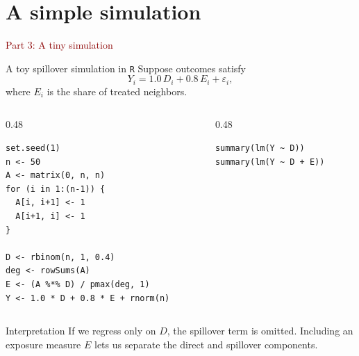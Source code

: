 \documentclass[dvipsnames,aspectratio=169,handout]{beamer}
\begin{document}

\section{A simple simulation}

\begin{frame}{}
\begin{center}
{\Huge \textcolor{DarkRed}{Part 3: A tiny simulation}}
\end{center}
\end{frame}

\begin{frame}[fragile]{A toy spillover simulation in \texttt{R}}
Suppose outcomes satisfy
\[
Y_i = 1.0\,D_i + 0.8\,E_i + \varepsilon_i,
\]
where $E_i$ is the share of treated neighbors.

\begin{columns}[T,onlytextwidth]
\begin{column}{0.48\textwidth}
\begin{lstlisting}
set.seed(1)
n <- 50
A <- matrix(0, n, n)
for (i in 1:(n-1)) {
  A[i, i+1] <- 1
  A[i+1, i] <- 1
}

D <- rbinom(n, 1, 0.4)
deg <- rowSums(A)
E <- (A %*% D) / pmax(deg, 1)
Y <- 1.0 * D + 0.8 * E + rnorm(n)
\end{lstlisting}
\end{column}
\begin{column}{0.48\textwidth}
\begin{lstlisting}
summary(lm(Y ~ D))
summary(lm(Y ~ D + E))
\end{lstlisting}
\end{column}
\end{columns}

\begin{alertblock}{Interpretation}
If we regress only on $D$, the spillover term is omitted.
Including an exposure measure $E$ lets us separate the direct and spillover components.
\end{alertblock}
\end{frame}
\end{document}

